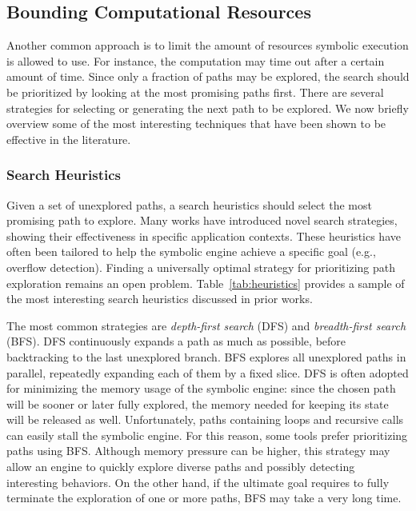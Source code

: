 \subsection{Bounding Computational Resources}
\label{heuristics}

Another common approach is to limit the amount of resources symbolic execution is allowed to use. For instance, the computation may time out after a certain amount of time. Since only a fraction of paths may be explored, the search should be prioritized by looking at the most promising paths first. There are several strategies for selecting or generating the next path to be explored. We now briefly overview some of the most interesting techniques that have been shown to be effective in the literature. %

\subsubsection{Search Heuristics}
\label{sss:search-heuristics}

Given a set of unexplored paths, a search heuristics should select the most promising path to explore. Many works have introduced novel search strategies, showing their effectiveness in specific application contexts. These heuristics have often been tailored to help the symbolic engine achieve a specific goal (e.g., overflow detection). Finding a universally optimal strategy for prioritizing path exploration remains an open problem. Table~\ref{tab:heuristics} provides a sample of the most interesting search heuristics discussed in prior works. 

The most common strategies are {\em depth-first search} (DFS) and {\em breadth-first search} (BFS). DFS continuously expands a path as much as possible, before backtracking to the last unexplored branch. BFS explores all unexplored paths in parallel, repeatedly expanding each of them by a fixed slice. DFS is often adopted for minimizing the memory usage of the symbolic engine: since the chosen path will be sooner or later fully explored, the memory needed for keeping its state will be released as well. Unfortunately, paths containing loops and recursive calls can easily stall the symbolic engine. For this reason, some tools prefer prioritizing paths using BFS. Although memory pressure can be higher, this strategy may allow an engine to quickly explore diverse paths and possibly detecting interesting behaviors. On the other hand, if the ultimate goal requires to fully terminate the exploration of one or more paths, BFS may take a very long time.

